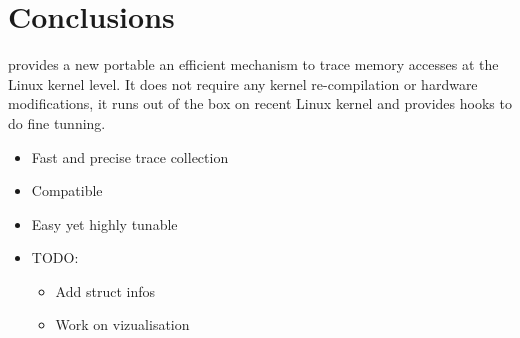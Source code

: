 \section{Conclusions}
\label{sec:cncl}

\Moca provides a new portable an efficient mechanism to trace memory accesses
at the Linux kernel level. It does not require any kernel re-compilation or
hardware modifications, it runs out of the box on recent Linux kernel and
provides hooks to do fine tunning.

\begin{itemize}
    \item Fast and precise trace collection
    \item Compatible
    \item Easy yet highly tunable
    \item TODO:
        \begin{itemize}
            \item Add struct infos
            \item Work on vizualisation
        \end{itemize}
\end{itemize}
